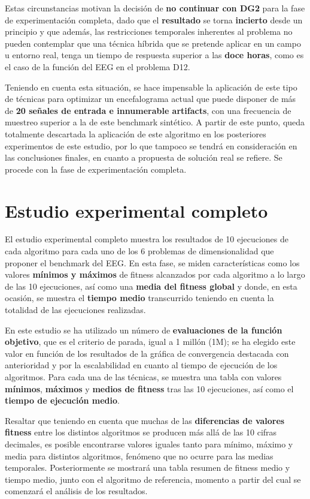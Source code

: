 Estas circunstancias motivan la decisión de \textbf{no continuar con DG2} para la fase de experimentación completa, dado que el \textbf{resultado} se torna \textbf{incierto} desde un principio y que además, las restricciones temporales inherentes al problema no pueden contemplar que una técnica híbrida que se pretende aplicar en un campo u entorno real, tenga un tiempo de respuesta superior a las \textbf{doce horas}, como es el caso de la función del EEG en el problema D12.

Teniendo en cuenta esta situación, se hace impensable la aplicación de este tipo de técnicas para optimizar un encefalograma actual que puede disponer de más de \textbf{20 señales de entrada e innumerable artifacts}, con una frecuencia de muestreo superior a la de este benchmark sintético. A partir de este punto, queda totalmente descartada la aplicación de este algoritmo en los posteriores experimentos de este estudio, por lo que tampoco se tendrá en consideración en las conclusiones finales, en cuanto a propuesta de solución real se refiere. Se procede con la fase de experimentación completa.


\section{Estudio experimental completo}\label{sect:FE2}

El estudio experimental completo muestra los resultados de 10 ejecuciones de cada algoritmo para cada uno de los 6 problemas de dimensionalidad que proponer el benchmark del EEG. En esta fase, se miden características como los valores \textbf{mínimos y máximos} de fitness alcanzados por cada algoritmo a lo largo de las 10 ejecuciones, así como una \textbf{media del fitness global} y donde, en esta ocasión, se muestra el \textbf{tiempo medio} transcurrido teniendo en cuenta la totalidad de las ejecuciones realizadas. 

En este estudio se ha utilizado un número de \textbf{evaluaciones de la función objetivo}, que es el criterio de parada, igual a 1 millón (1M); se ha elegido este valor en función de los resultados de la gráfica de convergencia destacada con anterioridad y por la escalabilidad en cuanto al tiempo de ejecución de los algoritmos. Para cada una de las técnicas, se muestra una tabla con valores \textbf{mínimos}, \textbf{máximos} y \textbf{medios de fitness} tras las 10 ejecuciones, así como el \textbf{tiempo de ejecución medio}. 

Resaltar que teniendo en cuenta que muchas de las \textbf{diferencias de valores fitness} entre los distintos algoritmos se producen más allá de las 10 cifras decimales, es posible encontrarse valores iguales tanto para mínimo, máximo y media para distintos algoritmos, fenómeno que no ocurre para las medias temporales. Posteriormente se mostrará una tabla resumen de fitness medio y tiempo medio, junto con el algoritmo de referencia, momento a partir del cual se comenzará el análisis de los resultados.

